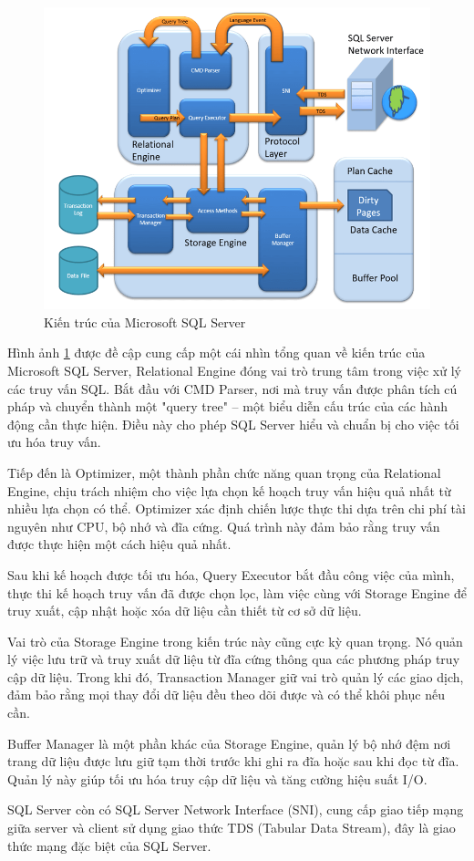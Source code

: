 \documentclass{article}[14pt]
\begin{document}
{{\begin{figure}
   \centering
    \includegraphics[width=0.5\linewidth]{image1.png}
    \caption{Kiến trúc của Microsoft SQL Server}
    \label{fig:overviewsmssql}
\end{figure}

Hình ảnh \ref{fig:overviewsmssql} được đề cập cung cấp một cái nhìn tổng quan về
kiến trúc của Microsoft SQL Server, Relational Engine đóng vai trò trung tâm trong việc xử lý các truy vấn SQL. Bắt đầu với CMD Parser, nơi mà truy vấn được phân tích cú pháp và chuyển thành một "query tree" – một biểu diễn cấu trúc của các hành động cần thực hiện. Điều này cho phép SQL Server hiểu và chuẩn bị cho việc tối ưu hóa truy vấn.

Tiếp đến là Optimizer, một thành phần chức năng quan trọng của Relational Engine, chịu trách nhiệm cho việc lựa chọn kế hoạch truy vấn hiệu quả nhất từ nhiều lựa chọn có thể. Optimizer xác định chiến lược thực thi dựa trên chi phí tài nguyên như CPU, bộ nhớ và đĩa cứng. Quá trình này đảm bảo rằng truy vấn được thực hiện một cách hiệu quả nhất.

Sau khi kế hoạch được tối ưu hóa, Query Executor bắt đầu công việc của mình, thực thi kế hoạch truy vấn đã được chọn lọc, làm việc cùng với Storage Engine để truy xuất, cập nhật hoặc xóa dữ liệu cần thiết từ cơ sở dữ liệu.

Vai trò của Storage Engine trong kiến trúc này cũng cực kỳ quan trọng. Nó quản lý việc lưu trữ và truy xuất dữ liệu từ đĩa cứng thông qua các phương pháp truy cập dữ liệu. Trong khi đó, Transaction Manager giữ vai trò quản lý các giao dịch, đảm bảo rằng mọi thay đổi dữ liệu đều theo dõi được và có thể khôi phục nếu cần.

Buffer Manager là một phần khác của Storage Engine, quản lý bộ nhớ đệm nơi trang dữ liệu được lưu giữ tạm thời trước khi ghi ra đĩa hoặc sau khi đọc từ đĩa. Quản lý này giúp tối ưu hóa truy cập dữ liệu và tăng cường hiệu suất I/O.

SQL Server còn có SQL Server Network Interface (SNI), cung cấp giao tiếp mạng giữa server và client sử dụng giao thức TDS (Tabular Data Stream), đây là giao thức mạng đặc biệt của SQL Server.

}}
\end{document}
